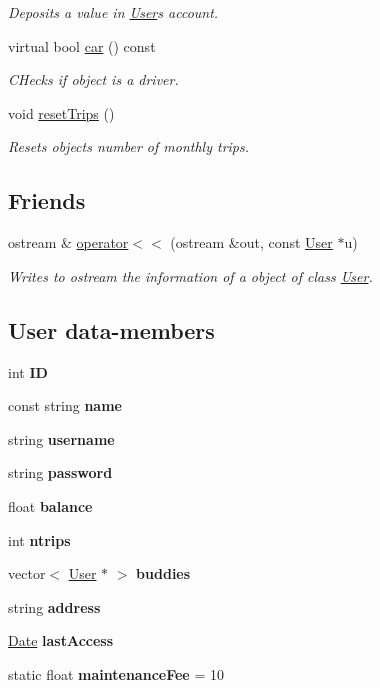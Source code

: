 \begin{Indent}
\begin{DoxyCompactItemize}
\begin{DoxyCompactList}\small\item\em Deposits a value in \hyperlink{class_user}{User}\textquotesingle{}s account. \end{DoxyCompactList}\item 
virtual bool \hyperlink{group___user_ga86635e817828c81ee5e18b2e802e3218}{car} () const
\begin{DoxyCompactList}\small\item\em C\+Hecks if object is a driver. \end{DoxyCompactList}\item 
void \hyperlink{group___user_ga6eb1d321c02d84e4bb839bc49d4ac074}{reset\+Trips} ()
\begin{DoxyCompactList}\small\item\em Resets object\textquotesingle{}s number of monthly trips. \end{DoxyCompactList}\end{DoxyCompactItemize}
\end{Indent}
\subsection*{Friends}
\begin{DoxyCompactItemize}
\item 
ostream \& \hyperlink{group___user_ga2bb61cca08fd63cdf2841686040958b1}{operator$<$$<$} (ostream \&out, const \hyperlink{class_user}{User} $\ast$u)
\begin{DoxyCompactList}\small\item\em Writes to ostream the information of a object of class \hyperlink{class_user}{User}. \end{DoxyCompactList}\end{DoxyCompactItemize}
\subsection*{User data-\/members}
\begin{DoxyCompactItemize}
\item 
int {\bfseries ID}
\item 
const string {\bfseries name}
\item 
string {\bfseries username}
\item 
string {\bfseries password}
\item 
float {\bfseries balance}
\item 
int {\bfseries ntrips}
\item 
vector$<$ \hyperlink{class_user}{User} $\ast$ $>$ {\bfseries buddies}
\item 
string {\bfseries address}
\item 
\hyperlink{class_date}{Date} {\bfseries last\+Access}
\item 
static float {\bfseries maintenance\+Fee} = 10
\end{DoxyCompactItemize}


